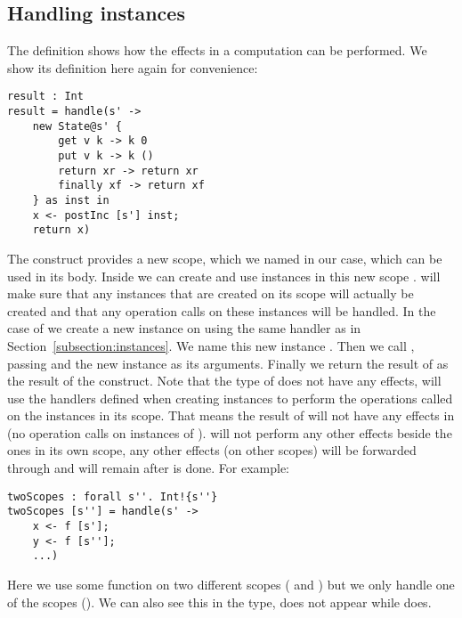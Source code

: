 \subsection{Handling instances}
The definition  shows how the effects in a computation can be performed.
We show its definition here again for convenience:

\begin{verbatim}
result : Int
result = handle(s' ->
	new State@s' {
		get v k -> k 0
		put v k -> k ()
		return xr -> return xr
		finally xf -> return xf
	} as inst in
	x <- postInc [s'] inst;
	return x)
\end{verbatim}

The  construct provides a new scope, which we named  in our case, which can be used in its body.
Inside  we can create and use instances in this new scope .
 will make sure that any instances that are created on its scope will actually be created and that any operation calls on these instances will be handled.
In the case of  we create a new  instance on  using the same handler as in Section~\ref{subsection:instances}.
We name this new instance .
Then we call , passing  and the new instance as its arguments.
Finally we return the result of  as the result of the  construct.
Note that the type of  does not have any effects,  will use the handlers defined when creating instances to perform the operations called on the instances in its scope.
That means the result of  will not have any effects in  (no operation calls on instances of ).
 will not perform any other effects beside the ones in its own scope, any other effects (on other scopes) will be forwarded through and will remain after  is done.
For example:

\begin{verbatim}
twoScopes : forall s''. Int!{s''}
twoScopes [s''] = handle(s' ->
	x <- f [s'];
	y <- f [s''];
	...)
\end{verbatim}

Here we use some function  on two different scopes ( and ) but we only handle one of the scopes ().
We can also see this in the type,  does not appear while  does. 

